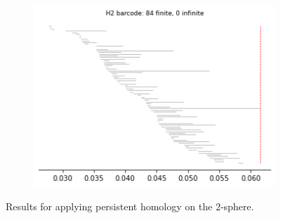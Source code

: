 \begin{figure}[H]
\begin{subfigure}[b]{0.24\textwidth}
\includegraphics[width=\textwidth]{figures/topology/dsphere_H2_barcode.png}
 \caption{}
\end{subfigure}
\caption{Results for applying persistent homology on the $2$-sphere.}
\end{figure}

